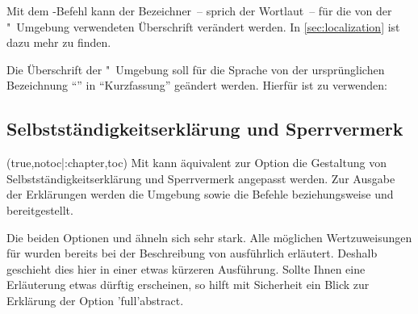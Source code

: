 \begin{DeclareEntity*}{}
\begin{DeclareEntity*}{}
\begin{DeclareEntity*}{}
%
%
Mit dem \KOMAScript-Befehl  kann der Bezeichner~-- 
sprich der Wortlaut~-- für die von der "~Umgebung 
verwendeten Überschrift verändert werden. In \autoref{sec:localization} ist
dazu mehr zu finden.
%
\begin{Example}
Die Überschrift der "~Umgebung soll für die Sprache 
 von der ursprünglichen Bezeichnung \enquote{\abstractname} in 
\enquote{Kurzfassung} geändert werden. Hierfür ist 
 zu 
verwenden:%
\begin{Code}[escapechar=§]
\end{Code}
%
\end{Example}



\subsection{%
  Selbstständigkeitserklärung und Sperrvermerk%
}
%
\begin{Declaration}
  {}
  (true,notoc|:chapter,toc)
\printdeclarationlist
%
Mit  kann äquivalent zur Option  die 
Gestaltung von Selbstständigkeitserklärung und Sperrvermerk angepasst werden.
Zur Ausgabe der Erklärungen werden die Umgebung  
sowie die Befehle  beziehungsweise  und 
 bereitgestellt. 

Die beiden Optionen  und  ähneln sich sehr 
stark. Alle möglichen Wertzuweisungen für  wurden bereits 
bei der Beschreibung von  ausführlich erläutert. Deshalb 
geschieht dies hier in einer etwas kürzeren Ausführung. Sollte Ihnen eine 
Erläuterung etwas dürftig erscheinen, so hilft mit Sicherheit ein Blick zur 
Erklärung der Option \Option'full'{abstract}.


\end{Declaration}
\end{DeclareEntity*}
\end{DeclareEntity*}
\end{DeclareEntity*}
